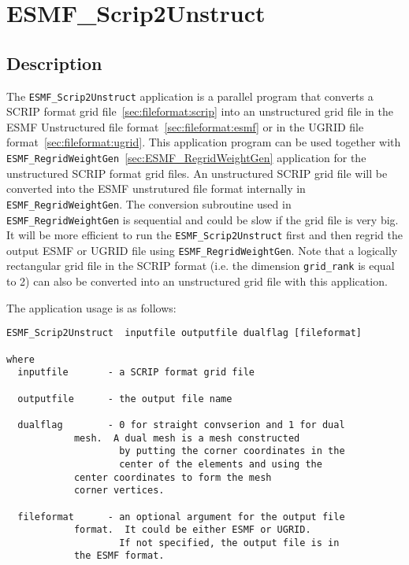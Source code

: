 
\section{ESMF\_Scrip2Unstruct}
\label{sec:ESMF_Scrip2Unstruct}

\subsection{Description}

The {\tt ESMF\_Scrip2Unstruct} application is a parallel program that converts a SCRIP format grid file~\ref{sec:fileformat:scrip} into an unstructured grid file in the ESMF Unstructured file format~\ref{sec:fileformat:esmf} or in the UGRID file format~\ref{sec:fileformat:ugrid}. This application program can be used together with {\tt ESMF\_RegridWeightGen}~\ref{sec:ESMF_RegridWeightGen} application for the unstructured SCRIP format grid files.  An unstructured SCRIP grid file will be converted into the ESMF unstrutured file format internally in {\tt ESMF\_RegridWeightGen}.  The conversion subroutine used in {\tt ESMF\_RegridWeightGen} is sequential and could be slow if the grid file is very big.  It will be more efficient to run the {\tt ESMF\_Scrip2Unstruct} first and then regrid the output ESMF or UGRID file using {\tt ESMF\_RegridWeightGen}.  Note that a logically rectangular grid file in the SCRIP format (i.e. the dimension {\tt grid\_rank} is equal to 2) can also be converted into an unstructured grid file with this application.   

The application usage is as follows:

\begin{verbatim}
ESMF_Scrip2Unstruct  inputfile outputfile dualflag [fileformat]

where
  inputfile       - a SCRIP format grid file

  outputfile      - the output file name
 
  dualflag        - 0 for straight convserion and 1 for dual 
		    mesh.  A dual mesh is a mesh constructed 
                    by putting the corner coordinates in the 
                    center of the elements and using the 
		    center coordinates to form the mesh 
		    corner vertices.

  fileformat      - an optional argument for the output file 
		    format.  It could be either ESMF or UGRID.
                    If not specified, the output file is in 
		    the ESMF format.  
  
\end{verbatim}
